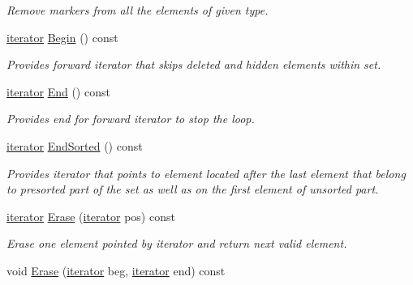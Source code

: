 \begin{DoxyCompactItemize}
\begin{DoxyCompactList}\small\item\em Remove markers from all the elements of given type. \end{DoxyCompactList}\item 
\hyperlink{classINMOST_1_1ElementSet_1_1iterator}{iterator} \hyperlink{classINMOST_1_1ElementSet_ad43c994c6cc58c382aa12e0705048226}{Begin} () const 
\begin{DoxyCompactList}\small\item\em Provides forward iterator that skips deleted and hidden elements within set. \end{DoxyCompactList}\item 
\hyperlink{classINMOST_1_1ElementSet_1_1iterator}{iterator} \hyperlink{classINMOST_1_1ElementSet_a5174eb80bbdbc6c68bee4b0f33eef46a}{End} () const 
\begin{DoxyCompactList}\small\item\em Provides end for forward iterator to stop the loop. \end{DoxyCompactList}\item 
\hyperlink{classINMOST_1_1ElementSet_1_1iterator}{iterator} \hyperlink{classINMOST_1_1ElementSet_a1d6d3edcf969e5a1c072224433783ea2}{End\-Sorted} () const 
\begin{DoxyCompactList}\small\item\em Provides iterator that points to element located after the last element that belong to presorted part of the set as well as on the first element of unsorted part. \end{DoxyCompactList}\item 
\hypertarget{classINMOST_1_1ElementSet_a70c7f2c20ecbc61eb65ef6013b2cf6e2}{\hyperlink{classINMOST_1_1ElementSet_1_1iterator}{iterator} \hyperlink{classINMOST_1_1ElementSet_a70c7f2c20ecbc61eb65ef6013b2cf6e2}{Erase} (\hyperlink{classINMOST_1_1ElementSet_1_1iterator}{iterator} pos) const }\label{classINMOST_1_1ElementSet_a70c7f2c20ecbc61eb65ef6013b2cf6e2}

\begin{DoxyCompactList}\small\item\em Erase one element pointed by iterator and return next valid element. \end{DoxyCompactList}\item 
\hypertarget{classINMOST_1_1ElementSet_a9a7725f9cf622fa8ff01b26a88aedb1e}{void \hyperlink{classINMOST_1_1ElementSet_a9a7725f9cf622fa8ff01b26a88aedb1e}{Erase} (\hyperlink{classINMOST_1_1ElementSet_1_1iterator}{iterator} beg, \hyperlink{classINMOST_1_1ElementSet_1_1iterator}{iterator} end) const }\label{classINMOST_1_1ElementSet_a9a7725f9cf622fa8ff01b26a88aedb1e}


\end{DoxyCompactItemize}
